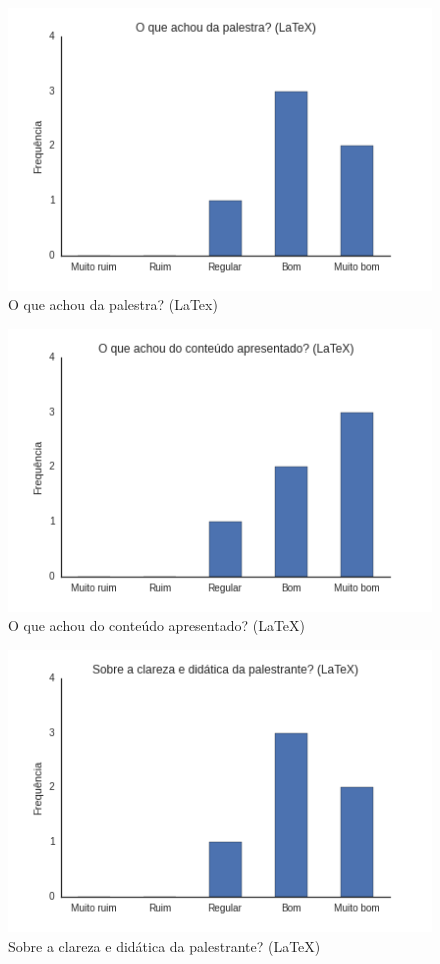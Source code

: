\documentclass[12pt]{article}
\begin{document}
\begin{figure}[p]
    \centering
    \includegraphics[scale=0.6]{images/latex1.png}
    \caption{\label{fig:latex1}O que achou da palestra? (LaTex)}
\end{figure}

\begin{figure}[p]
    \centering
    \includegraphics[scale=0.6]{images/latex2.png}
    \caption{\label{fig:latex2}O que achou do conteúdo apresentado? (LaTeX)}
\end{figure}

\begin{figure}[p]
    \centering
    \includegraphics[scale=0.6]{images/latex3.png}
    \caption{\label{fig:latex3}Sobre a clareza e didática da palestrante? (LaTeX)}
\end{figure}
\end{document}
